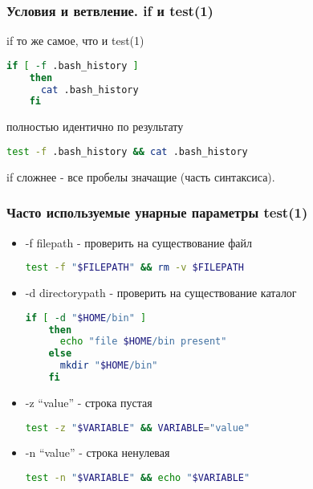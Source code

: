 \begin{frame}[fragile]
  \frametitle{Условия и ветвление. if и test(1)}

  \alert{if то же самое, что и test(1)} \pause

      \begin{lstlisting}[language=sh,frame=single,basicstyle=\normalsize,breaklines=true]
	if [ -f .bash_history ]
	then
	  cat .bash_history
	fi
      \end{lstlisting} 
      полностью идентично по результату
      \begin{lstlisting}[language=sh,frame=single,basicstyle=\normalsize,breaklines=true]
	test -f .bash_history && cat .bash_history
      \end{lstlisting}
      if сложнее - все пробелы значащие (часть синтаксиса).
\end{frame}

\begin{frame}[fragile]
  \frametitle{Часто используемые унарные параметры test(1)}
  \begin{itemize}
    \item \alert{-f filepath} - проверить на существование файл
      \begin{lstlisting}[language=sh,frame=single,basicstyle=\normalsize,breaklines=true]
	test -f "$FILEPATH" && rm -v $FILEPATH
      \end{lstlisting} \pause
    \item \alert{-d directorypath} - проверить на существование каталог
      \begin{lstlisting}[language=sh,frame=single,basicstyle=\tiny,breaklines=true]
	if [ -d "$HOME/bin" ]
	then 
	  echo "file $HOME/bin present"
	else
	  mkdir "$HOME/bin"
	fi
      \end{lstlisting} \pause
    \item \alert{-z ``value''} - строка пустая
      \begin{lstlisting}[language=sh,frame=single,basicstyle=\normalsize,breaklines=true]
	test -z "$VARIABLE" && VARIABLE="value"
      \end{lstlisting} \pause
    \item \alert{-n ``value''} - строка ненулевая
      \begin{lstlisting}[language=sh,frame=single,basicstyle=\normalsize,breaklines=true]
	test -n "$VARIABLE" && echo "$VARIABLE"
      \end{lstlisting} 
  \end{itemize}

\end{frame}

